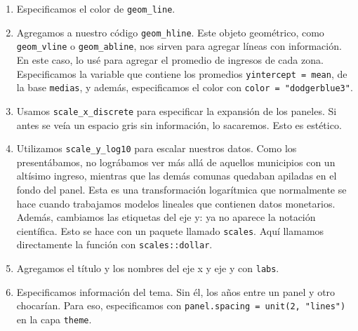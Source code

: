 \documentclass[]{book}
\newenvironment{Shaded}{\begin{snugshade}}{\end{snugshade}}
\newcommand{\CommentTok}[1]{\textcolor[rgb]{0.56,0.35,0.01}{\textit{#1}}}
\newcommand{\DataTypeTok}[1]{\textcolor[rgb]{0.13,0.29,0.53}{#1}}
\newcommand{\KeywordTok}[1]{\textcolor[rgb]{0.13,0.29,0.53}{\textbf{#1}}}
\newcommand{\NormalTok}[1]{#1}
\newcommand{\OperatorTok}[1]{\textcolor[rgb]{0.81,0.36,0.00}{\textbf{#1}}}
\newcommand{\StringTok}[1]{\textcolor[rgb]{0.31,0.60,0.02}{#1}}
\begin{document}
\begin{Shaded}
\end{Shaded}

\begin{enumerate}
\def\labelenumi{\arabic{enumi}.}
\setcounter{enumi}{1}
\item
  Especificamos el color de \texttt{geom\_line}.
\item
  Agregamos a nuestro código \texttt{geom\_hline}. Este objeto
  geométrico, como \texttt{geom\_vline} o \texttt{geom\_abline}, nos
  sirven para agregar líneas con información. En este caso, lo usé para
  agregar el promedio de ingresos de cada zona. Especificamos la
  variable que contiene los promedios \texttt{yintercept\ =\ mean}, de
  la base \texttt{medias}, y además, especificamos el color con
  \texttt{color\ =\ "dodgerblue3"}.
\item
  Usamos \texttt{scale\_x\_discrete} para especificar la expansión de
  los paneles. Si antes se veía un espacio gris sin información, lo
  sacaremos. Esto es estético.
\item
  Utilizamos \texttt{scale\_y\_log10} para escalar nuestros datos. Como
  los presentábamos, no lográbamos ver más allá de aquellos municipios
  con un altísimo ingreso, mientras que las demás comunas quedaban
  apiladas en el fondo del panel. Esta es una transformación logarítmica
  que normalmente se hace cuando trabajamos modelos lineales que
  contienen datos monetarios. Además, cambiamos las etiquetas del eje y:
  ya no aparece la notación científica. Esto se hace con un paquete
  llamado \texttt{scales}. Aquí llamamos directamente la función con
  \texttt{scales::dollar}.
\item
  Agregamos el título y los nombres del eje x y eje y con \texttt{labs}.
\item
  Especificamos información del tema. Sin él, los años entre un panel y
  otro chocarían. Para eso, especificamos con
  \texttt{panel.spacing\ =\ unit(2,\ "lines")} en la capa
  \texttt{theme}.
\end{enumerate}
\end{document}

